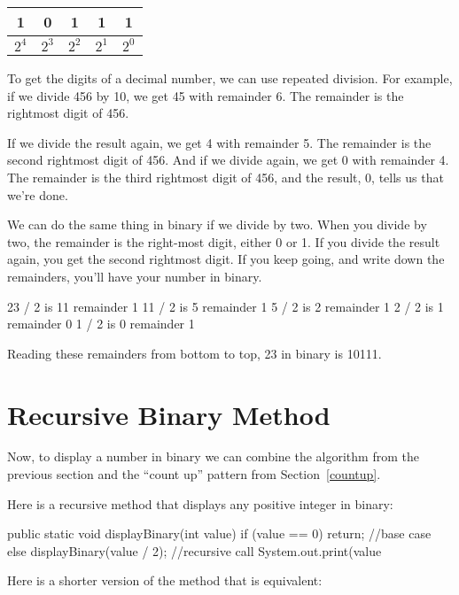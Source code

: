 \begin{center}
\begin{tabular}{|c|c|c|c|c|}
\hline
1 & 0 & 1 & 1 & 1 \\
\hline
$2^4$ & $2^3$ & $2^2$ & $2^1$ & $2^0$ \\
\hline
\end{tabular}
\end{center}

To get the digits of a decimal number, we can use repeated division.
For example, if we divide 456 by 10, we get 45 with remainder 6.
The remainder is the rightmost digit of 456.

If we divide the result again, we get 4 with remainder 5.
The remainder is the second rightmost digit of 456.
And if we divide again, we get 0 with remainder 4.
The remainder is the third rightmost digit of 456, and the result, 0, tells us that we're done.

We can do the same thing in binary if we divide by two.
When you divide by two, the remainder is the right-most digit, either 0 or 1.
If you divide the result again, you get the second rightmost digit.
If you keep going, and write down the remainders, you'll have your number in binary.

\begin{stdout}
23 / 2 is 11 remainder 1
11 / 2 is  5 remainder 1
 5 / 2 is  2 remainder 1
 2 / 2 is  1 remainder 0
 1 / 2 is  0 remainder 1
\end{stdout}

Reading these remainders from bottom to top, 23 in binary is 10111.


\section{Recursive Binary Method}

Now, to display a number in binary we can combine the algorithm from the previous section and the ``count up'' pattern from Section~\ref{countup}.

Here is a recursive method that displays any positive integer in binary:

\begin{code}
public static void displayBinary(int value) {
    if (value == 0) {
       return;  //base case
    } else {
       displayBinary(value / 2); //recursive call
       System.out.print(value %
    }
}
\end{code}

Here is a shorter version of the method that is equivalent:

